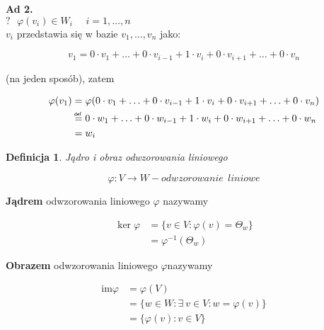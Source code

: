 \documentclass[a5paper,8pt]{article}
\newtheorem{definition}{Definicja}[section]
\newcommand\defeq[1]{\mathrel{\overset{\makebox[0pt]{\mbox{\normalfont\tiny\sffamily def~{#1}}}}{=}}}
\begin{document}
    \large{\textbf{Ad 2.}} \\
    $ ? ~~~ \varphi(v_i) \in W_i ~~~~~~ i = 1, \ldots, n $ \\
    $ v_i $ przedstawia się w bazie $ v_1, \ldots, v_n $ jako:

    \begin{equation*}
        v_1 = 0 \cdot v_1 + \ldots + 0 \cdot v_{i-1} + 1 \cdot v_i + 0 \cdot v_{i+1} + \ldots + 0 \cdot v_n
    \end{equation*}

    (na jeden sposób), zatem

    \begin{equation*}
        \begin{aligned}
            \varphi(v_1) & = \varphi(0 \cdot v_1 + \ldots + 0 \cdot v_{i-1} + 1 \cdot v_i + 0 \cdot v_{i+1} + \ldots + 0 \cdot v_n) \\
            & \defeq{} 0 \cdot w_1 + \ldots + 0 \cdot w_{i-1} + 1 \cdot w_i + 0 \cdot w_{i+1} + \ldots + 0 \cdot w_n \\
            & = w_i
        \end{aligned}
    \end{equation*}

    \begin{definition}
        Jądro i obraz odwzorowania liniowego
    \end{definition}

    \begin{equation*}
        \varphi : V \longrightarrow W - odwzorowanie~~liniowe
    \end{equation*}

    \textbf{Jądrem} odwzorowania liniowego $ \varphi $ nazywamy

    \begin{equation*}
        \begin{aligned}
            \ker \varphi & = \{ v \in V: \varphi(v) = \Theta_w \} \\
            & = \varphi^{-1}( \Theta_w )
        \end{aligned}
    \end{equation*}

    \textbf{Obrazem} odwzorowania liniowego $ \varphi $nazywamy

    \begin{equation*}
        \begin{aligned}
            \text{im} \varphi & = \varphi(V) \\
            & = \{ w \in W: \exists~ v \in V: w = \varphi(v) \} \\
            & = \{ \varphi(v): v \in V \}
        \end{aligned}
    \end{equation*}
\end{document}

